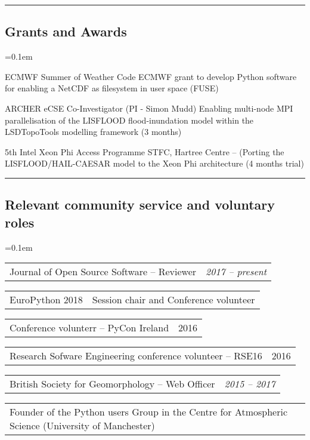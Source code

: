 \documentclass[10.5pt,a4]{article}
\makeatletter
\newenvironment{indentsection}[1]%
{\begin{list}{}%
	{\setlength{\leftmargin}{#1}}%
	\item[]%
}
{\end{list}}
\newcommand{\headerrow}[2]
{\begin{tabular*}{\linewidth}{l@{\extracolsep{\fill}}r}
	#1 &
	#2 \\
\end{tabular*}}
\makeatother
\begin{document}
\hrule
\vspace{-0.4em}
\subsection*{Grants and Awards}
	\parskip=0.1em
\begin{itemize*}
	\item 
	  {ECMWF Summer of Weather Code}
	  {ECMWF grant to develop Python software for enabling a NetCDF as filesystem in user space (FUSE)}

	\item 
	  {ARCHER eCSE Co-Investigator (PI - Simon Mudd)}
	  {Enabling multi-node MPI parallelisation of the LISFLOOD flood-inundation model within the LSDTopoTools modelling framework (3  months) }

	\item 
	  {5th Intel Xeon Phi Access Programme}
	  {STFC, Hartree Centre -- (Porting the LISFLOOD/HAIL-CAESAR model to the Xeon Phi architecture (4 months trial)}


\end{itemize*}

\hrule
\vspace{-0.4em}
\subsection*{Relevant community service and voluntary roles}
	\parskip=0.1em
\begin{itemize*}
	\item
	\headerrow
	  {Journal of Open Source Software -- Reviewer}
	  {\textit{2017 -- present}}

	\item 
	\headerrow 
	  {EuroPython 2018}
	  {Session chair and Conference volunteer}
	  
	\item 
	\headerrow 
	  {Conference volunterr -- PyCon Ireland}
	  {2016}

	\item 
	\headerrow 
	  {Research Sofware Engineering conference volunteer -- RSE16}
	  {2016}
	  
	\item 
	\headerrow 
	  {British Society for Geomorphology -- Web Officer}
	  {\textit{2015 -- 2017}}

	\item 
	\headerrow 
	  {Founder of the Python users Group in the Centre for Atmospheric Science (University of Manchester)}
	  {\textit{}}



\end{itemize*}



%
%
%
%
\end{document}
